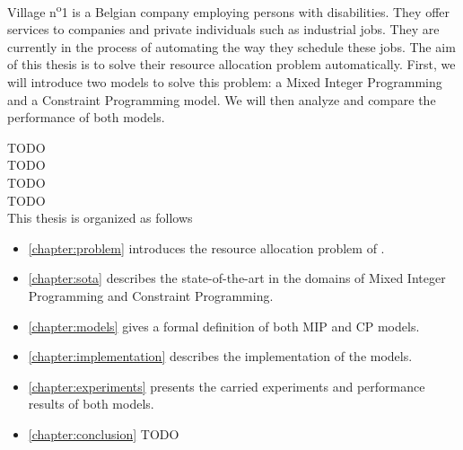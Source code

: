 \documentclass[../thesis.tex]{subfiles}
\begin{document}
Village n\textsuperscript{o}1 is a Belgian company employing persons with disabilities.
They offer services to companies and private individuals such as industrial jobs.
They are currently in the process of automating the way they schedule these jobs. 
The aim of this thesis is to solve their resource allocation problem
automatically. First, we will introduce two models to solve this problem: a Mixed Integer Programming and 
a Constraint Programming model. We will then analyze and compare the performance of both models. 



TODO \\ 
TODO\\ 
TODO\\ 
TODO\\



This thesis is organized as follows

\begin{itemize}
  \item[] \autoref{chapter:problem} introduces the resource allocation problem of \vone.
  \item[] \autoref{chapter:sota} describes the state-of-the-art in the domains of Mixed Integer Programming and Constraint Programming. 
  \item[] \autoref{chapter:models} gives a formal definition of both MIP and CP models.
  \item[] \autoref{chapter:implementation} describes the implementation of the models.
  \item[] \autoref{chapter:experiments} presents the carried experiments and performance results of both models.
  \item[] \autoref{chapter:conclusion} TODO  
\end{itemize}
\end{document}
